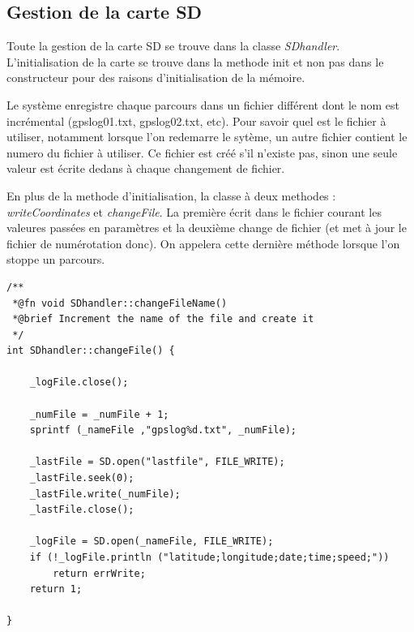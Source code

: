 \documentclass[a4paper,12pt,titlepage]{article}
\begin{document}
\subsection{Gestion de la carte SD}

Toute la gestion de la carte SD se trouve dans la classe \emph{SDhandler}.
L'initialisation de la carte se trouve dans la methode init et non pas dans le constructeur pour des raisons d'initialisation de la mémoire.

Le système enregistre chaque parcours dans un fichier différent dont le nom est incrémental (gpslog01.txt, gpslog02.txt, etc). 
Pour savoir quel est le fichier à utiliser, notamment lorsque l'on redemarre le sytème, un autre fichier contient le numero du fichier à utiliser.
Ce fichier est créé s'il n'existe pas, sinon une seule valeur est écrite dedans à chaque changement de fichier.

En plus de la methode d'initialisation, la classe à deux methodes : \emph{writeCoordinates} et \emph{changeFile}.
La première écrit dans le fichier courant les valeures passées en paramètres et la deuxième change de fichier (et met à jour le fichier de numérotation donc).
On appelera cette dernière méthode lorsque l'on stoppe un parcours.


\begin{lstlisting}[caption={changeFile}, label={changeFile}]
/**
 *@fn void SDhandler::changeFileName()
 *@brief Increment the name of the file and create it
 */
int SDhandler::changeFile() {

    _logFile.close();

    _numFile = _numFile + 1;
    sprintf (_nameFile ,"gpslog%d.txt", _numFile);

    _lastFile = SD.open("lastfile", FILE_WRITE);
    _lastFile.seek(0);
    _lastFile.write(_numFile);
    _lastFile.close();

    _logFile = SD.open(_nameFile, FILE_WRITE);
    if (!_logFile.println ("latitude;longitude;date;time;speed;"))
        return errWrite;
    return 1;

}
\end{lstlisting}
\end{document}
